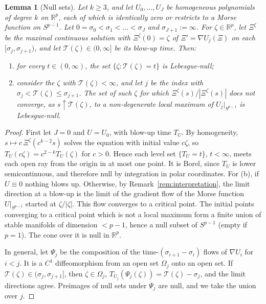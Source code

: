 \documentclass[11pt]{article}
\newtheorem{lemma}[theorem]{Lemma}
\theoremstyle{definition}
\theoremstyle{remark}
\numberwithin{equation}{section}
\newcommand{\R}{\mathbb{R}}
\newcommand{\cT}{\mathcal{T}}
\begin{document}
\begin{lemma}[Null sets]\label{lem:null}
Let $k\ge3$, and let $U_0,\dots,U_J$ be homogeneous polynomials of degree $k$ on $\R^p$, each of which is identically zero or restricts to a Morse function on $S^{p-1}$. Let $0=\sigma_0<\sigma_1<\dots<\sigma_J$ and $\sigma_{J+1}:=\infty$. For $\zeta\in\R^p$, let $\Xi^\zeta$ be the maximal continuous solution with $\Xi^\zeta(0)=\zeta$ of $\Xi'=\nabla U_j(\Xi)$ on each $[\sigma_j,\sigma_{j+1})$, and let $\cT(\zeta)\in(0,\infty]$ be its blow-up time. Then:
\begin{enumerate}[label=\textup{(\alph*)}]
\item for every $t\in(0,\infty)$, the set $\{\zeta:\cT(\zeta)=t\}$ is Lebesgue-null;
\item consider the $\zeta$ with $\cT(\zeta)<\infty$, and let $j$ be the index with $\sigma_j<\cT(\zeta)\le\sigma_{j+1}$. The set of such $\zeta$ for which $\Xi^\zeta(s)/|\Xi^\zeta(s)|$ does not converge, as $s\uparrow\cT(\zeta)$, to a non-degenerate local maximum of $U_j|_{S^{p-1}}$ is Lebesgue-null.
\end{enumerate}
\end{lemma}

\begin{proof}
First let $J=0$ and $U=U_0$, with blow-up time $T_U$. By homogeneity, $s\mapsto c\,\Xi^\zeta(c^{k-2}s)$ solves the equation with initial value $c\zeta$, so $T_U(c\zeta)=c^{2-k}T_U(\zeta)$ for $c>0$. Hence each level set $\{T_U=t\}$, $t<\infty$, meets each open ray from the origin in at most one point. It is Borel, since $T_U$ is lower semicontinuous, and therefore null by integration in polar coordinates. For (b), if $U\equiv0$ nothing blows up. Otherwise, by Remark~\ref{rem:interpretation}, the limit direction at a blow-up is the limit of the gradient flow of the Morse function $U|_{S^{p-1}}$ started at $\zeta/|\zeta|$. This flow converges to a critical point. The initial points converging to a critical point which is not a local maximum form a finite union of stable manifolds of dimension $<p-1$, hence a null subset of $S^{p-1}$ (empty if $p=1$). The cone over it is null in $\R^p$.

In general, let $\Psi_j$ be the composition of the time-$(\sigma_{i+1}-\sigma_i)$ flows of $\nabla U_i$ for $i<j$. It is a $C^1$ diffeomorphism from an open set $\Omega_j$ onto an open set. If $\cT(\zeta)\in(\sigma_j,\sigma_{j+1}]$, then $\zeta\in\Omega_j$, $T_{U_j}(\Psi_j(\zeta))=\cT(\zeta)-\sigma_j$, and the limit directions agree. Preimages of null sets under $\Psi_j$ are null, and we take the union over $j$.
\end{proof}
\end{document}
